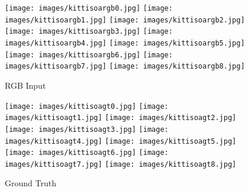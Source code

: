 \documentclass[5p]{elsarticle}
\begin{document}
\begin{figure*}[t!]
     \centering
          \begin{subfigure}[t]{0.16\textwidth}
         \centering
         \caption{RGB Input}
         \texttt{[image: images/kittisoargb0.jpg]}
         \hspace{1em}
         \texttt{[image: images/kittisoargb1.jpg]}
         \hspace{1em}
         \texttt{[image: images/kittisoargb2.jpg]}
         \hspace{1em}
         \texttt{[image: images/kittisoargb3.jpg]}
         \hspace{1em}
         \texttt{[image: images/kittisoargb4.jpg]}
         \hspace{1em}
         \texttt{[image: images/kittisoargb5.jpg]}
         \hspace{1em}
         \texttt{[image: images/kittisoargb6.jpg]}
         \hspace{1em}
         \texttt{[image: images/kittisoargb7.jpg]}
         \hspace{1em}
         \texttt{[image: images/kittisoargb8.jpg]}
         \label{kittisubfig0:rgb}
     \end{subfigure}
     \begin{subfigure}[t]{0.16\textwidth}
         \centering
         \caption{Ground Truth}
         \texttt{[image: images/kittisoagt0.jpg]}
         \hspace{1em}
         \texttt{[image: images/kittisoagt1.jpg]}
         \hspace{1em}
         \texttt{[image: images/kittisoagt2.jpg]}
         \hspace{1em}
         \texttt{[image: images/kittisoagt3.jpg]}
         \hspace{1em}
         \texttt{[image: images/kittisoagt4.jpg]}
         \hspace{1em}
         \texttt{[image: images/kittisoagt5.jpg]}
         \hspace{1em}
         \texttt{[image: images/kittisoagt6.jpg]}
         \hspace{1em}
         \texttt{[image: images/kittisoagt7.jpg]}
         \hspace{1em}
         \texttt{[image: images/kittisoagt8.jpg]}

\end{subfigure}
\end{figure*}
\end{document}
